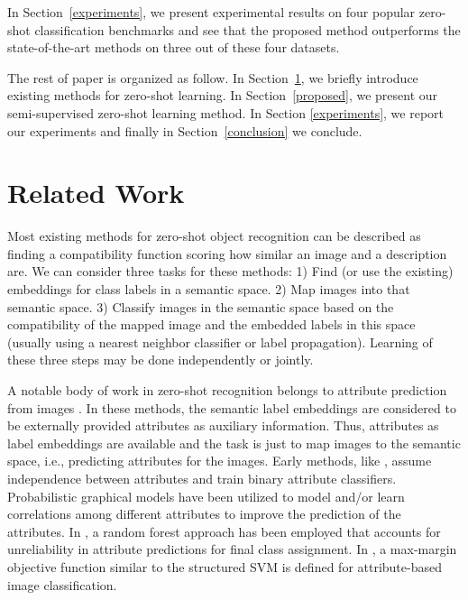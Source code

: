 \documentclass[letterpaper]{article}
\begin{document}
In Section~\ref{experiments}, we present experimental results on four popular zero-shot classification benchmarks
 and see that the proposed method outperforms the state-of-the-art methods on three out of these four datasets.

The rest of paper is organized as follow. In Section~\ref{related}, we briefly introduce existing methods for zero-shot learning.
In Section~\ref{proposed}, we present our semi-supervised zero-shot learning method. In Section \ref{experiments}, we report our experiments and finally in Section~\ref{conclusion}
we conclude.

\section{Related Work} \label{related}
Most existing methods for zero-shot object recognition can be described as finding a compatibility function scoring how
similar an image and a description are.
We can consider three tasks for these methods:
  1) Find (or use the existing) embeddings for class labels in a semantic space.
  2) Map images into that semantic space.
  3) Classify images in the semantic space based on the compatibility of the mapped image and the embedded labels in this space (usually using a nearest neighbor classifier or label propagation).
Learning of these three steps may be done independently or jointly.

A notable body of work in zero-shot recognition belongs to attribute prediction from images \cite{lampert09,topicmodel,ajoint11,unified13,suzuki14}.
In these methods, the semantic label embeddings are considered to be externally provided attributes as auxiliary information. Thus, attributes as label embeddings are available and the task is just to map images to the semantic space, i.e., predicting attributes for the images.
Early methods, like \cite{lampert09}, assume independence between attributes and train binary attribute classifiers.
Probabilistic graphical models have been utilized to model and/or learn correlations among different attributes \cite{topicmodel,unified13} to improve the prediction of the attributes.
In \cite{jayaraman14}, a random forest approach has been employed that accounts for unreliability in attribute predictions for final class assignment.
In \cite{Akata2015pami}, a max-margin objective function similar to the structured SVM is defined for attribute-based image classification.
\end{document}
